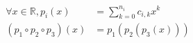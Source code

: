 \documentclass[preview]{standalone}
\begin{document}
\begin{align*}
\forall x \in \mathbb{R}, p_i(x) & = \sum_{k=0}^{n_i} c_{i,k} x^k \\(p_1 \circ p_2 \circ p_3)(x) & = p_1(p_2(p_3(x)))
\end{align*}
\end{document}
